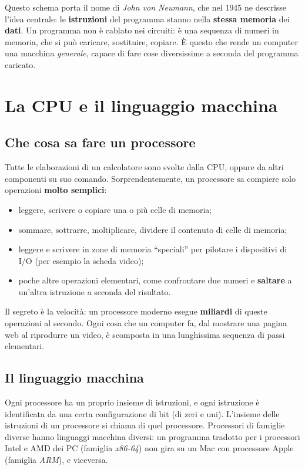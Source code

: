 Questo schema porta il nome di \textit{John von Neumann}, che nel 1945 ne
descrisse l'idea centrale: le \textbf{istruzioni} del programma stanno
nella \textbf{stessa memoria} dei \textbf{dati}. Un programma non è cablato
nei circuiti: è una sequenza di numeri in memoria, che si può caricare,
sostituire, copiare. È questo che rende un computer una macchina
\textit{generale}, capace di fare cose diversissime a seconda del programma
caricato.

\section{La CPU e il linguaggio macchina}

\subsection{Che cosa sa fare un processore}

Tutte le elaborazioni di un calcolatore sono svolte dalla CPU, oppure da
altri componenti su suo comando. Sorprendentemente, un processore sa
compiere solo operazioni \textbf{molto semplici}:

\begin{itemize}
  \item leggere, scrivere o copiare una o più celle di memoria;
  \item sommare, sottrarre, moltiplicare, dividere il contenuto di celle di
        memoria;
  \item leggere e scrivere in zone di memoria “speciali” per pilotare i
        dispositivi di I/O (per esempio la scheda video);
  \item poche altre operazioni elementari, come confrontare due numeri e
        \textbf{saltare} a un'altra istruzione a seconda del risultato.
\end{itemize}

Il segreto è la velocità: un processore moderno esegue \textbf{miliardi} di
queste operazioni al secondo. Ogni cosa che un computer fa, dal mostrare
una pagina web al riprodurre un video, è scomposta in una lunghissima
sequenza di passi elementari.

\subsection{Il linguaggio macchina}

Ogni processore ha un proprio insieme di istruzioni, e ogni istruzione è
identificata da una certa configurazione di bit (di zeri e uni). L'insieme
delle istruzioni di un processore si chiama  di
quel processore. Processori di famiglie diverse hanno linguaggi macchina
diversi: un programma tradotto per i processori Intel e AMD dei PC (famiglia
\textit{x86-64}) non gira su un Mac con processore Apple (famiglia
\textit{ARM}), e viceversa.

